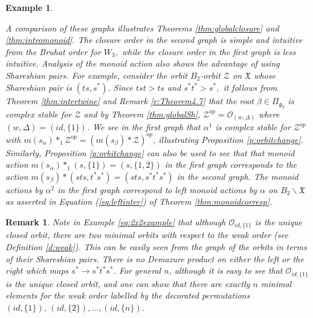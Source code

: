 \documentclass[12pt]{amsart}
\numberwithin{equation}{section}
\newtheorem{rem}[thm]{Remark}
\newtheorem{exam}[thm]{Example}
\newcommand{\cZ}{{\mathcal Z}}
\newcommand{\fg}{\mbox{${\mathfrak g}$}}
\newcommand{\ms}{m(s_{\alpha})}
\begin{document}
\begin{exam}
\begin{center}
\end{center}

A comparison of these graphs illustrates Theorems \ref{thm:globalclosure} and \ref{thm:intromonoid}.  The closure order in the second graph is simple and intuitive from the Bruhat order for $W_3,$ while the closure order in the first graph is less intuitive.   Analysis of the monoid action also shows the advantage of using Shareshian pairs.   For example, consider the orbit $B_{2}$-orbit $\cZ$ on $\mathfrak{X}$ whose Shareshian pair is $(ts, s^{*})$.  Since $tst>ts$ and $s^{*}t^{*}>s^{*},$ it follows from Theorem \ref{thm:intertwine} and Remark \ref{r:Theorem4.7} that the root $\beta\in\Pi_{\fg_{3}}$ is complex stable for $\cZ$ and by Theorem \ref{thm:globalSh}, $\cZ^{op}=\mathcal{O}_{(w,\Delta)}$ where $(w,\Delta)=(id, \{1\})$.  We see in the first graph that $\alpha^{1}$ is complex stable for $\cZ^{op}$ with $\ms*_{1} \cZ^{op}=(m(s_{\beta})*\cZ)^{op}$, illustrating Proposition \ref{p:orbitchange}.  Similarly, Proposition \ref{p:orbitchange} can also be used to see that that monoid action $m(s_{\alpha})*_{1}(s,\{1\})=(s,\{1,2\})$ in the first graph corresponds to the action 
$m(s_{\beta})*(sts, t^{*}s^{*})=(sts, s^{*}t^{*}s^{*})$ in the second graph.  The monoid actions by $\alpha^{2}$ in the first graph correspond to left monoid actions by $\alpha$ on $B_{2}\backslash\mathfrak{X}$ as asserted in Equation (\ref{eq:leftinter}) of Theorem \ref{thm:monoidcorresp}.   
\end{exam}


 \begin{rem}\label{r:minimal}
 Note in Example \ref{eq:2x2example} that although $\mathcal{O}_{id,\{ 1\}}$ is the unique closed orbit, there are two minimal orbits with respect to the weak order (see Definition \ref{d:weak}).  This can be easily seen from the graph of the orbits in terms of their Shareshian pairs.  There is no Demazure product on either the left or the right which maps $s^{*}\to s^{*}t^{*}s^{*}$.  For general $n$, although it is easy to see that  $\mathcal{O}_{id,\{ 1\}}$ is the unique closed orbit, and one can show that there are exactly $n$ minimal elements for the weak order labelled by the decorated permutations $(id, \{1\}),\, (id, \{2\}),\dots, (id,\{n\})$.
\end{rem}
  
\end{document}
